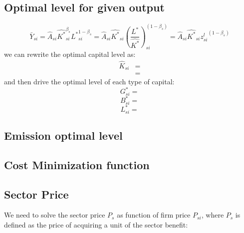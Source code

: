 \documentclass[12pt]{article} %
\begin{document}
\subsection{Optimal level for given output} \label{Ap:optimal level for given output}
\begin{equation*}
    \bar{Y}_{si} = \hat{A}_{si} \hat{K^*}_{si}^{\beta_s} {L^*}_{si}^{1-\beta_s} = \hat{A}_{si} \hat{K^*}_{si} ({\frac{L^*}{\hat{K^*}}})_{si}^{(1-\beta_s)}= \hat{A}_{si} \hat{K^*}_{si} {z_{si}^l}^{(1-\beta_s)}
\end{equation*}
we can rewrite the optimal capital level as:
\begin{equation*}
    \begin{split}
        \hat{K}_{si} &= \\
        & = 
    \end{split}
\end{equation*}
and then drive the optimal level of each type of capital:
\begin{equation*}
    G_{si}^* = 
\end{equation*}
\begin{equation*}
    B_{si}^* = 
\end{equation*}
\begin{equation*}
    L_{si}^* = 
\end{equation*}

\subsection{Emission optimal level} \label{Ap:emission optimal level}


\subsection{Cost Minimization function} \label{Ap:cost minimization function}


\subsection{Sector Price} \label{Ap:sector price}
 We need to solve the sector price $P_s$ as function of firm price $P_{si}$, where $P_s$ is defined as the price of acquiring a unit of the sector benefit:
    
\end{document}
